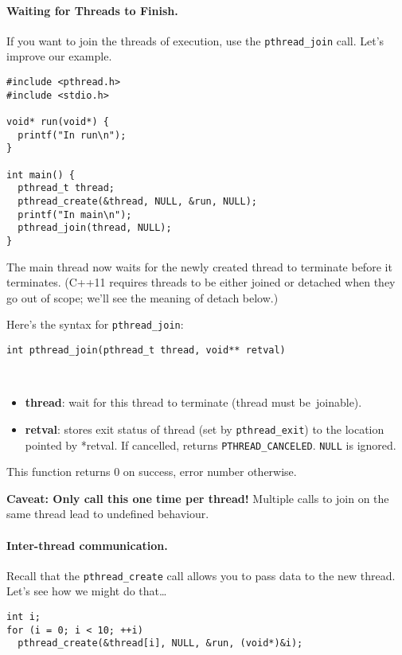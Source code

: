 \documentclass[11pt]{article}
\begin{document}
\paragraph{Waiting for Threads to Finish.} If you want to join the threads
of execution, use the {\tt pthread\_join} call. Let's improve our example.

\begin{lstlisting}
#include <pthread.h>
#include <stdio.h>

void* run(void*) {
  printf("In run\n");
}

int main() {
  pthread_t thread;
  pthread_create(&thread, NULL, &run, NULL);
  printf("In main\n");
  pthread_join(thread, NULL);
}
\end{lstlisting}

The main thread now waits for the newly created thread to terminate
before it terminates. (C++11 requires threads to be either joined or
detached when they go out of scope; we'll see the meaning of detach below.)

Here's the syntax for {\tt pthread\_join}:

\begin{lstlisting}
int pthread_join(pthread_t thread, void** retval)
\end{lstlisting}
~\vspace*{-3em}
\begin{itemize}
\item  {\bf thread}: wait for this thread to terminate (thread must be~joinable).

\item  {\bf retval}: stores exit status of thread (set by {\tt pthread\_exit}) to
                 the location pointed by *retval. If cancelled, returns
                 {\tt PTHREAD\_CANCELED}. {\tt NULL} is ignored.
\end{itemize}

This function returns 0 on success, error number otherwise.

 {\bf Caveat: Only call this one time per thread!} Multiple calls to join on the same thread
  lead to undefined behaviour.

\paragraph{Inter-thread communication.} Recall that the {\tt pthread\_create} 
call allows you to pass data to the new thread. Let's see how we might do that\ldots

\begin{lstlisting}
int i;
for (i = 0; i < 10; ++i)
  pthread_create(&thread[i], NULL, &run, (void*)&i);
\end{lstlisting}
\end{document}
